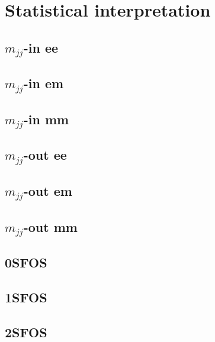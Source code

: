 \documentclass[12pt]{article}
\newcommand{\analysispath}{/home/users/phchang/public_html/analysis/www/code/WWWAnalysisRun2/analysis/plots/WWW2017_v5.0.0/test32}
\begin{document}
\clearpage

\section{Statistical interpretation}

\subsection{$m_{jj}$-in ee}
\subsection{$m_{jj}$-in em}
\subsection{$m_{jj}$-in mm}
\subsection{$m_{jj}$-out ee}
\subsection{$m_{jj}$-out em}
\subsection{$m_{jj}$-out mm}
\subsection{0SFOS}
\subsection{1SFOS}
\subsection{2SFOS}
\end{document}
